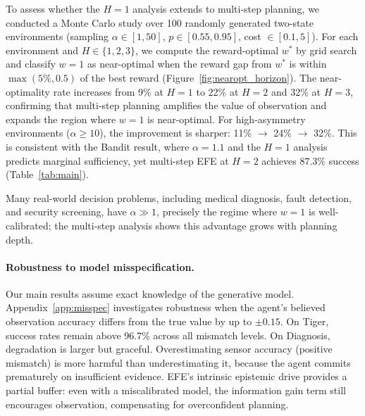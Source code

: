 \documentclass[runningheads]{llncs}
\begin{document}
To assess whether the $H{=}1$ analysis extends to multi-step planning, we conducted a Monte Carlo study over 100 randomly generated two-state environments (sampling $\alpha \in [1, 50]$, $p \in [0.55, 0.95]$, cost $\in [0.1, 5]$). For each environment and $H \in \{1, 2, 3\}$, we compute the reward-optimal $w^*$ by grid search and classify $w{=}1$ as near-optimal when the reward gap from $w^*$ is within $\max(5\%, 0.5)$ of the best reward (Figure~\ref{fig:nearopt_horizon}). The near-optimality rate increases from 9\% at $H{=}1$ to 22\% at $H{=}2$ and 32\% at $H{=}3$, confirming that multi-step planning amplifies the value of observation and expands the region where $w{=}1$ is near-optimal. For high-asymmetry environments ($\alpha \geq 10$), the improvement is sharper: 11\% $\to$ 24\% $\to$ 32\%. This is consistent with the Bandit result, where $\alpha{=}1.1$ and the $H{=}1$ analysis predicts marginal sufficiency, yet multi-step EFE at $H{=}2$ achieves $87.3\%$ success (Table~\ref{tab:main}).

Many real-world decision problems, including medical diagnosis, fault detection, and security screening, have $\alpha \gg 1$, precisely the regime where $w{=}1$ is well-calibrated; the multi-step analysis shows this advantage grows with planning depth.

\paragraph{Robustness to model misspecification.}
Our main results assume exact knowledge of the generative model. Appendix~\ref{app:misspec} investigates robustness when the agent's believed observation accuracy differs from the true value by up to $\pm 0.15$. On Tiger, success rates remain above 96.7\% across all mismatch levels. On Diagnosis, degradation is larger but graceful. Overestimating sensor accuracy (positive mismatch) is more harmful than underestimating it, because the agent commits prematurely on insufficient evidence. EFE's intrinsic epistemic drive provides a partial buffer: even with a miscalibrated model, the information gain term still encourages observation, compensating for overconfident planning.
\end{document}
